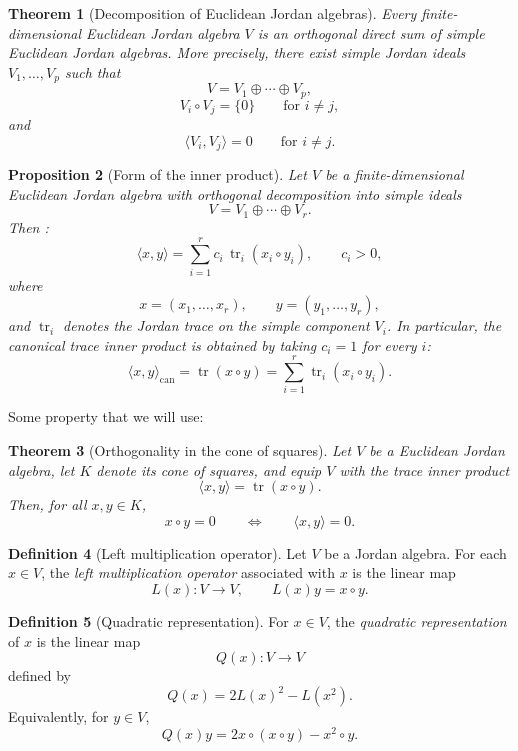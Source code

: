 \documentclass[a4paper,11pt]{book}
\theoremstyle{plain}
\newtheorem{theorem}{Theorem}[chapter]
\newtheorem{proposition}[theorem]{Proposition}
\theoremstyle{definition}
\newtheorem{definition}[theorem]{Definition}
\theoremstyle{remark}
\numberwithin{equation}{chapter}
\numberwithin{algorithm}{chapter}
\begin{document}
	
	\begin{theorem}[Decomposition of Euclidean Jordan algebras]
		Every finite-dimensional Euclidean Jordan algebra $V$ is an orthogonal direct
		sum of simple Euclidean Jordan algebras. More precisely, there exist simple
		Jordan ideals $V_1,\dots,V_p$ such that
		\[
		V=V_1\oplus\cdots\oplus V_p,
		\]
		\[
		V_i\circ V_j=\{0\}\qquad\text{for }i\neq j,
		\]
		and
		\[
		\langle V_i,V_j\rangle=0\qquad\text{for }i\neq j.
		\]
		
	\end{theorem}
	
	
	\begin{proposition}[Form of the inner product]
		Let $V$ be a finite-dimensional Euclidean Jordan algebra with orthogonal
		decomposition into simple ideals
		\[
		V=V_1\oplus\cdots\oplus V_r.
		\]
		Then :
		\[
		\langle x,y\rangle
		=
		\sum_{i=1}^r c_i\,
		\operatorname{tr}_i(x_i\circ y_i),
		\qquad c_i>0,
		\]
		where
		\[
		x=(x_1,\dots,x_r),\qquad
		y=(y_1,\dots,y_r),
		\]
		and $\operatorname{tr}_i$ denotes the Jordan trace on the simple component
		$V_i$. In particular, the canonical trace inner product is obtained by
		taking $c_i=1$ for every $i$:
		\[
		\langle x,y\rangle_{\mathrm{can}}
		=
		\operatorname{tr}(x\circ y)
		=
		\sum_{i=1}^r\operatorname{tr}_i(x_i\circ y_i).
		\]
	\end{proposition}
	
	Some property that we will use:
	
	\begin{theorem}[Orthogonality in the cone of squares]
		Let $V$ be a Euclidean Jordan algebra, let $K$ denote its cone of squares,
		and equip $V$ with the trace inner product
		\[
		\langle x,y\rangle=\operatorname{tr}(x\circ y).
		\]
		Then, for all $x,y\in K$,
		\[
		x\circ y=0
		\qquad\Longleftrightarrow\qquad
		\langle x,y\rangle=0.
		\]
	\end{theorem}
	
	\begin{definition}[Left multiplication operator]
		Let $V$ be a Jordan algebra. For each $x\in V$, the
		\emph{left multiplication operator} associated with $x$ is the linear map
		\[
		L(x):V\to V,
		\qquad
		L(x)y=x\circ y.
		\]
	\end{definition}
	\begin{definition}[Quadratic representation]
		For $x\in V$, the \emph{quadratic representation} of $x$ is the linear map
		\[
		Q(x):V\to V
		\]
		defined by
		\[
		Q(x)=2L(x)^2-L(x^2).
		\]
		Equivalently, for $y\in V$,
		\[
		Q(x)y
		=
		2x\circ(x\circ y)-x^2\circ y.
		\]
	\end{definition}
	
\end{document}
